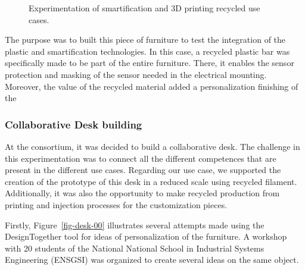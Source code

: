 \documentclass[
  11pt,
]{article}
\begin{document}
\begin{figure}
\begin{minipage}[t]{0.50\linewidth}
{\centering 


}

\end{minipage}%

\caption{\label{fig-uninova}Experimentation of smartification and 3D
printing recycled use cases.}

\end{figure}

The purpose was to built this piece of furniture to test the integration
of the plastic and smartification technologies. In this case, a recycled
plastic bar was specifically made to be part of the entire furniture.
There, it enables the sensor protection and masking of the sensor needed
in the electrical mounting. Moreover, the value of the recycled material
added a personalization finishing of the

\hypertarget{collaborative-desk-building}{%
\subsubsection{Collaborative Desk
building}\label{collaborative-desk-building}}

At the consortium, it was decided to build a collaborative desk. The
challenge in this experimentation was to connect all the different
competences that are present in the different use cases. Regarding our
use case, we supported the creation of the prototype of this desk in a
reduced scale using recycled filament. Additionally, it was also the
opportunity to make recycled production from printing and injection
processes for the customization pieces.

Firstly, Figure~\ref{fig-desk-00} illustrates several attempts made
using the DesignTogether tool for ideas of personalization of the
furniture. A workshop with 20 students of the National National School
in Industrial Systems Engineering (ENSGSI) was organized to create
several ideas on the same object.
\end{document}
